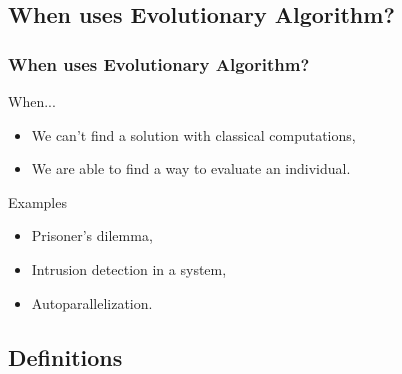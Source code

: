 \subsection{When uses Evolutionary Algorithm?}

\begin{frame}
  \frametitle{When uses Evolutionary Algorithm?}
  \begin{block}{When...}
    \begin{itemize}
    \item We can't find a solution with classical computations,
    \item We are able to find a way to evaluate an individual.
    \end{itemize}
  \end{block}

  \begin{block}{Examples}
    \begin{itemize}
    \item Prisoner's dilemma\cite{axelrod1991},
    \item Intrusion detection in a system\cite{crosby1995},
    \item Autoparallelization\cite{walsh1996}.
    \end{itemize}
  \end{block}
\end{frame}

\subsection{Definitions}

